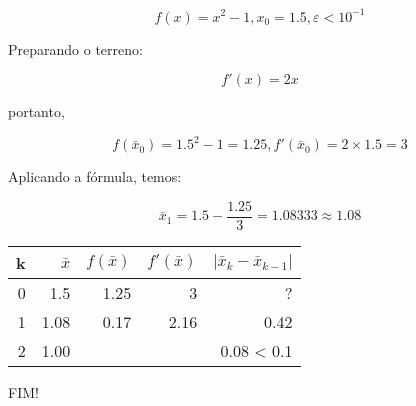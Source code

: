 \documentclass[a4paper]{article}
\begin{document}
\begin{displaymath}
  f(x) = x^2 -1, x_0 = 1.5, \varepsilon <10^{-1}
\end{displaymath}

Preparando o terreno:

\begin{displaymath}
  f'(x) = 2x
\end{displaymath}

portanto,

\begin{displaymath}
  f(\bar{x}_0) = 1.5^2-1 = 1.25, f'(\bar{x}_0) = 2 \times 1.5 = 3
\end{displaymath}

Aplicando a fórmula, temos:

\begin{displaymath}
  \bar{x}_1 = 1.5 - \frac{1.25}{3} = 1.08333 \approx 1.08
\end{displaymath}

\begin{center}
  \begin{tabular}{r|r|r|r|r}
    k & $\bar{x}$ & $f(\bar{x})$ & $f'(\bar{x})$ & $|\bar{x}_k - \bar{x}_{k-1}|$\\
    \hline
    0 & 1.5 & 1.25 & 3 & ? \\
    \hline
    1 & 1.08 & 0.17 & 2.16 & 0.42 \\
    \hline
    2 & 1.00 &  &  & 0.08 < 0.1 \\
  \end{tabular}
\end{center}

FIM!
\end{document}
